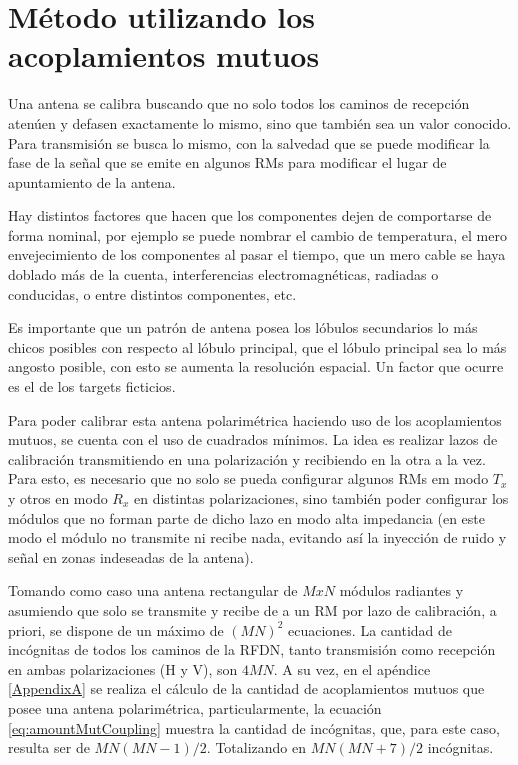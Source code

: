 \chapter{Método utilizando los acoplamientos mutuos}
\label{ch:estado}

Una antena se calibra buscando que no solo todos los caminos de recepción atenúen y defasen exactamente lo mismo, sino que 
también sea un valor conocido. Para transmisión se busca lo mismo, con la salvedad que se puede modificar la fase de la 
señal que se emite en algunos RMs para modificar el lugar de apuntamiento de la antena.

Hay distintos factores que hacen que los componentes dejen de comportarse de forma nominal, por ejemplo se puede nombrar el
cambio de temperatura, el mero envejecimiento de los componentes al pasar el tiempo, que un mero cable se haya doblado más
de la cuenta, interferencias electromagnéticas, radiadas o conducidas, o entre distintos componentes, etc. 

Es importante que un patrón de antena posea los lóbulos secundarios lo más chicos posibles con respecto al lóbulo principal,
que el lóbulo principal sea lo más angosto posible, con esto se aumenta la resolución espacial. Un factor que ocurre es el 
de los targets ficticios.



Para poder calibrar esta antena polarimétrica haciendo uso de los acoplamientos mutuos, se cuenta con el uso de 
cuadrados mínimos. La idea es realizar lazos de calibración transmitiendo en una polarización y recibiendo en la
otra a la vez. Para esto, es necesario que no solo se pueda configurar algunos RMs em modo $T_x$ y otros en modo $R_x$ en 
distintas polarizaciones, sino también poder configurar los módulos que no forman parte de dicho lazo en modo alta 
impedancia (en este modo el módulo no transmite ni recibe nada, evitando así la inyección de ruido y señal en zonas 
indeseadas de la antena). 

Tomando como caso una antena rectangular de $M x N$ módulos radiantes y asumiendo que solo se transmite y recibe de a un 
RM por lazo de calibración, a priori, se dispone de un máximo de $(MN)^2$ ecuaciones. La cantidad de incógnitas de todos
los caminos de la RFDN, tanto transmisión como recepción en ambas polarizaciones (H y V), son $4MN$. A su vez, en el 
apéndice \ref{AppendixA} se realiza el cálculo de la cantidad de acoplamientos mutuos que posee una antena polarimétrica,
particularmente, la ecuación \ref{eq:amountMutCoupling} muestra la cantidad de incógnitas, que, para este caso, resulta 
ser de $MN(MN-1)/2$. Totalizando en $MN(MN + 7)/2$ incógnitas.

